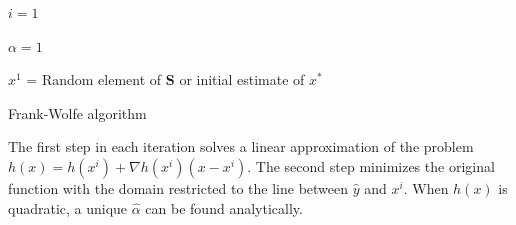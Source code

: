 \documentclass[12pt,oneside,final]{thesis}\usepackage[]{graphicx}\usepackage[]{color}
\begin{document}
\begin{algorithm}[H]
 \SetAlgoLined
 $i=1$\;
 
 $\alpha=1$\;
 
 $x^1$ = Random element of   $\mathbf{S}$  or initial estimate of $\mathit{x^*}$ \;
 
 \caption{Frank-Wolfe algorithm}
\end{algorithm}

The first step in each iteration solves a linear approximation of the problem $h(x)=h(x^i)+\nabla{h(x^i)}(x-x^i)$. The second step minimizes the original function with the domain restricted to the line between $\hat{y}$ and $x^{i}$. When $h(x)$ is quadratic, a unique  $\hat{\alpha}$ can be found analytically.
\end{document}

